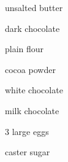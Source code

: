\begin{ingredient}
    \begin{main}
        \item {} unsalted butter
        \item {} dark chocolate
        \item {} plain flour
        \item {} cocoa powder
        \item {} white chocolate
        \item {} milk chocolate
        \item 3 large eggs
        \item {} caster sugar
    \end{main}
\end{ingredient}
